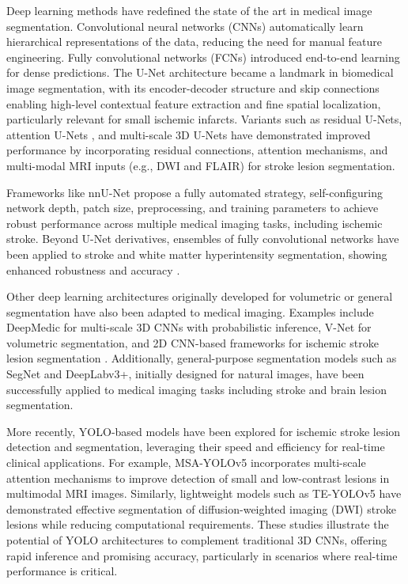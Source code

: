 \documentclass[12pt]{article}
\begin{document}
Deep learning methods have redefined the state of the art in medical image segmentation. Convolutional neural networks (CNNs) automatically learn hierarchical representations of the data, reducing the need for manual feature engineering. Fully convolutional networks (FCNs) introduced end-to-end learning for dense predictions. The U-Net architecture \cite{ronnebergerUNetConvolutionalNetworks2015} became a landmark in biomedical image segmentation, with its encoder-decoder structure and skip connections enabling high-level contextual feature extraction and fine spatial localization, particularly relevant for small ischemic infarcts. Variants such as residual U-Nets, attention U-Nets \cite{oktayAttentionUNetLearning2018}, and multi-scale 3D U-Nets \cite{kamnitsasEfficientMultiscale3D2017} have demonstrated improved performance by incorporating residual connections, attention mechanisms, and multi-modal MRI inputs (e.g., DWI and FLAIR) for stroke lesion segmentation.

Frameworks like nnU-Net \cite{isenseeAbstractNnUNetSelfadapting2019} propose a fully automated strategy, self-configuring network depth, patch size, preprocessing, and training parameters to achieve robust performance across multiple medical imaging tasks, including ischemic stroke. Beyond U-Net derivatives, ensembles of fully convolutional networks have been applied to stroke and white matter hyperintensity segmentation, showing enhanced robustness and accuracy \cite{liFullyConvolutionalNetwork2018}.

Other deep learning architectures originally developed for volumetric or general segmentation have also been adapted to medical imaging. Examples include DeepMedic \cite{kamnitsasEfficientMultiscale3D2017} for multi-scale 3D CNNs with probabilistic inference, V-Net for volumetric segmentation, and 2D CNN-based frameworks for ischemic stroke lesion segmentation \cite{shah2DCNNBasedSegmentation2020,gheibiCNNResDeepLearning2023}. Additionally, general-purpose segmentation models such as SegNet and DeepLabv3+, initially designed for natural images, have been successfully applied to medical imaging tasks including stroke and brain lesion segmentation.

More recently, YOLO-based models have been explored for ischemic stroke lesion detection and segmentation, leveraging their speed and efficiency for real-time clinical applications. For example, MSA-YOLOv5 \cite{chenMSAYOLOv5MultiscaleAttentionbased2023} incorporates multi-scale attention mechanisms to improve detection of small and low-contrast lesions in multimodal MRI images. Similarly, lightweight models such as TE-YOLOv5 \cite{chenAutomaticDetectionStroke2022} have demonstrated effective segmentation of diffusion-weighted imaging (DWI) stroke lesions while reducing computational requirements. These studies illustrate the potential of YOLO architectures to complement traditional 3D CNNs, offering rapid inference and promising accuracy, particularly in scenarios where real-time performance is critical.
\end{document}

